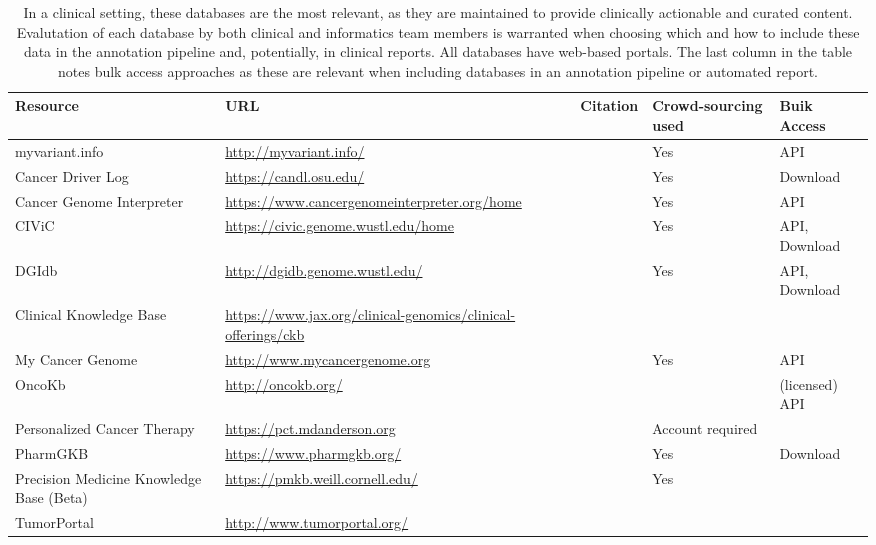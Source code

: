 \documentclass{article}
\begin{document}
\begin{table}[p]
\centering
\begin{tabularx}{\textwidth}{p{3cm}XXp{1.5cm}p{1.5cm}}
  \hline
  Resource & URL & Citation & Crowd-sourcing used & Buik Access \\
  \hline
  myvariant.info & \url{http://myvariant.info/} &
  \parencite{Xin2016-yc} & Yes & API \\
  Cancer Driver Log & \url{https://candl.osu.edu/} & \parencite{Damodaran2015-so} & Yes & Download\\
  Cancer Genome Interpreter & \url{https://www.cancergenomeinterpreter.org/home} & \parencite{Tamborero2017-ay} & Yes & API \\
  CIViC & \url{https://civic.genome.wustl.edu/home} &
  \parencite{Griffith2016-sy} & Yes & API, Download \\
  DGIdb & \url{http://dgidb.genome.wustl.edu/} &
  \parencite{Wagner2016-fs,Griffith2013-uv} & Yes & API, Download\\
  Clinical Knowledge Base &
  \url{https://www.jax.org/clinical-genomics/clinical-offerings/ckb} &
  & & \\
  My Cancer Genome & \url{http://www.mycancergenome.org} & \parencite{Micheel2014-pz} & Yes & API \\
  OncoKb & \url{http://oncokb.org/} & \parencite{Chakravarty2017-gx} &
  & (licensed) API \\
  Personalized Cancer Therapy & \url{https://pct.mdanderson.org} & &
  Account required \\
  PharmGKB & \url{https://www.pharmgkb.org/} &
  \parencite{Hewett2002-yu} & Yes & Download \\
  Precision Medicine Knowledge Base (Beta) & \url{https://pmkb.weill.cornell.edu/} & \parencite{Huang2016-zx} & Yes & \\
  TumorPortal & \url{http://www.tumorportal.org/} &
  \parencite{Lawrence2014-ss} & & \\
  \hline
\end{tabularx}
\caption{In a clinical setting, these databases
are the most relevant, as they are maintained to provide clinically
actionable and curated content. Evalutation of each database by both
clinical and informatics team members is warranted when
choosing which and how to include these data in the annotation
pipeline and, potentially, in clinical reports. All databases have
web-based portals. The last column in the table notes bulk access
approaches as these are relevant when including databases in an
annotation pipeline or automated report.}
\label{table:3}
\end{table}
 
\end{document}

